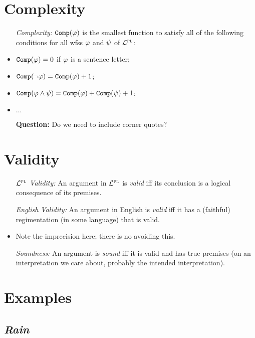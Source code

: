 \documentclass[a4paper, 11pt]{article} %
\begin{document}
\section*{Complexity}

\begin{itemize}[leftmargin=1.5in,labelsep=.15in] %
  \item[\it Complexity:] $\texttt{Comp}(\varphi)$ is the smallest function to satisfy all of the following conditions for all wfss $\varphi$ and $\psi$ of $\mathcal{L}^{\textsc{pl}}$: 
    \item $\texttt{Comp}(\varphi) = 0$ if $\varphi$ is a sentence letter; 
    \item $\texttt{Comp}(\neg\varphi) = \texttt{Comp}(\varphi) + 1$; 
    \item $\texttt{Comp}(\varphi \wedge \psi) = \texttt{Comp}(\varphi) + \texttt{Comp}(\psi) + 1$; 
    \item $\ldots$
  \item[\bf Question:] Do we need to include corner quotes?
\end{itemize}




\section*{Validity}

\begin{itemize}[leftmargin=1.2in,labelsep=.15in] %
  \item[\it $\mathcal{L}^{\textsc{pl}}$ Validity:] An argument in $\mathcal{L}^{\textsc{pl}}$ is \textit{valid} iff its conclusion is a logical consequence of its premises.
  \item[\it English Validity:] An argument in English is \textit{valid} iff it has a (faithful) regimentation (in some language) that is valid.
    \item Note the imprecision here; there is no avoiding this.
  \item[\it Soundness:] An argument is \textit{sound} iff it is valid and has true premises (on an interpretation we care about, probably the intended interpretation).
\end{itemize}





\section*{Examples}


\subsection*{\it \textbf{Rain}}
\end{document}
